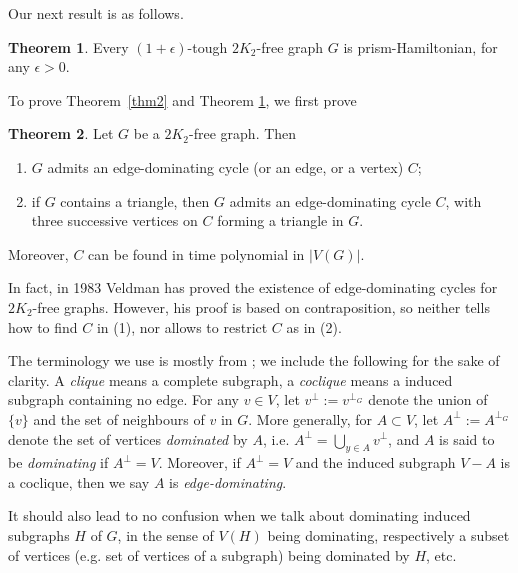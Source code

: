 \documentclass{amsart}
\theoremstyle{definition}
\newtheorem{theorem}{Theorem}
\newtheorem{proposition}{Proposition}
\begin{document}
Our next result is as follows.
\begin{theorem}\label{thm1}
Every $(1+\epsilon)$-tough $2K_2$-free graph $G$ is prism-Hamiltonian, for any $\epsilon>0$.
\end{theorem}

To prove Theorem~\ref{thm2} and Theorem \ref{thm1}, we first prove
\begin{theorem}\label{addgen1} 
Let $G$ be a $2K_2$-free graph. Then
\begin{enumerate}
\item $G$ admits an edge-dominating cycle (or an edge, or a vertex) $C$; 
\item if $G$ contains a triangle, then $G$ admits 
an edge-dominating cycle $C$, with three successive vertices on $C$ forming a triangle in $G$. 
\end{enumerate}
Moreover, $C$ can be found in time polynomial in $|V(G)|$.
\end{theorem}

In fact, in 1983 Veldman \cite{veldman83} has proved the existence of
edge-dominating cycles for $2K_2$-free graphs. However, his proof is based on
contraposition, so neither tells how to find $C$ in (1), nor
allows to restrict $C$ as in (2).

The terminology we use is  mostly from \cite{bomu08}; we include the following for the sake of
clarity.  
A {\em clique} means a complete subgraph, a {\em coclique} means a
induced subgraph containing no edge. 
For any
$v\in V$, let $v^\perp:=v^{\perp_G}$ denote the union of $\{v\}$ and the set of
neighbours of $v$ in $G$.  More generally, for $A\subset V$, let
$A^\perp:=A^{\perp_G}$ denote the set of vertices {\em dominated} by $A$, i.e.
$A^\perp=\bigcup\limits_{y\in A}v^\perp$, and $A$ is said to be {\em
dominating} if $A^\perp=V$.
Moreover, if $A^{\perp}=V$ and the induced subgraph $V-A$ is a coclique, then we say $A$ is {\em edge-dominating}. 
 
It should also lead to no confusion when we talk
about  dominating induced subgraphs $H$ of $G$, in the sense of $V(H)$ being
dominating, respectively a subset of vertices (e.g. set of vertices of a
subgraph) being dominated by $H$, etc.


\end{document}
